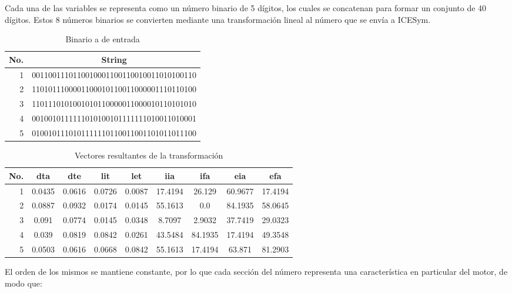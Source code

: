 Cada una de las variables se representa como un número binario de 5 dígitos,
los cuales se concatenan para formar un conjunto de 40 dígitos.
%
Estos 8 números binarios se convierten mediante una transformación lineal
al número que se envía a ICESym.

\begin{table}
    \centering
        \begin{tabular}{rc} \toprule
            No. & String                                   \\ \midrule
            1   & 0011001110110010001100110010011010100110 \\
            2   & 1101011100001100010110011000001110110100 \\
            3   & 1101110101001010110000011000010110101010 \\
            4   & 0010010111111010100101111111010011010001 \\
            5   & 0100101110101111110110011001101011011100 \\ \bottomrule
        \end{tabular}
    \caption{Binario a de entrada}\label{tab:mapeo_pre}
\end{table}

\begin{table}
    \centering
        \begin{tabular}{rcccccccc} \toprule
            No. & dta    & dte    & lit    & let    & iia     & ifa     & eia     & efa     \\ \midrule
            1   & 0.0435 & 0.0616 & 0.0726 & 0.0087 & 17.4194 & 26.129  & 60.9677 & 17.4194 \\
            2   & 0.0887 & 0.0932 & 0.0174 & 0.0145 & 55.1613 & 0.0     & 84.1935 & 58.0645 \\
            3   & 0.091  & 0.0774 & 0.0145 & 0.0348 & 8.7097  & 2.9032  & 37.7419 & 29.0323 \\
            4   & 0.039  & 0.0819 & 0.0842 & 0.0261 & 43.5484 & 84.1935 & 17.4194 & 49.3548 \\
            5   & 0.0503 & 0.0616 & 0.0668 & 0.0842 & 55.1613 & 17.4194 & 63.871  & 81.2903 \\ \bottomrule
        \end{tabular}
    \caption{Vectores resultantes de la transformación}\label{tab:mapeo_post}
\end{table}

El orden de los mismos se mantiene constante, por lo que cada sección del número
representa una característica en particular del motor, de modo que:

